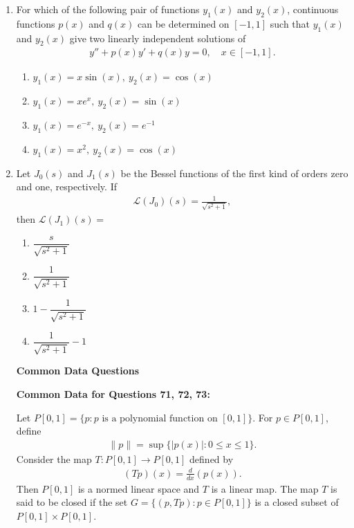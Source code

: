 \documentclass[journal]{IEEEtran}
\numberwithin{equation}{enumi}
\numberwithin{figure}{enumi}
\begin{document}
\begin{enumerate}
\item For which of the following pair of functions $y_1(x)$ and $y_2(x)$, continuous functions $p(x)$ and $q(x)$ can be determined on $[-1, 1]$ such that $y_1(x)$ and $y_2(x)$ give two linearly independent solutions of \hfill{}
\begin{align*}
y'' + p(x)y' + q(x)y = 0,\quad x \in [-1, 1].
\end{align*}
\begin{multicols}{2}
    \begin{enumerate}
        \item $y_1(x) = x \sin(x),\ y_2(x) = \cos(x)$
        \item $y_1(x) = x e^x,\ y_2(x) = \sin(x)$ 
        \item $y_1(x) = e^{-x},\ y_2(x) = e^{-1}$
        \item $y_1(x) = x^2,\ y_2(x) = \cos(x)$
    \end{enumerate}
    \end{multicols}
 



\item Let $J_0(s)$ and $J_1(s)$ be the Bessel functions of the first kind of orders zero and one, respectively. If
\begin{align*}
\mathcal{L}(J_0)(s) = \frac{1}{\sqrt{s^2 + 1}},
\end{align*}
then $\mathcal{L}(J_1)(s) =$
\hfill{}
\begin{multicols}{2}
    \begin{enumerate}
        \item $\dfrac{s}{\sqrt{s^2 + 1}}$
        \item $\dfrac{1}{\sqrt{s^2 + 1}}$
        \item $1 - \dfrac{1}{\sqrt{s^2 + 1}}$
        \item $\dfrac{1}{\sqrt{s^2 + 1}} - 1$
    \end{enumerate}
    \end{multicols}
 
\bigskip

\begin{center}
    \textbf{Common Data Questions}
\end{center}

\textbf{Common Data for Questions 71, 72, 73:}

Let $P[0,1] = \{p : p \text{ is a polynomial function on } [0,1]\}$. For $p \in P[0,1]$, define
\begin{align*}
\|p\| = \sup \{|p(x)| : 0 \leq x \leq 1\}.
\end{align*}
Consider the map $T : P[0,1] \rightarrow P[0,1]$ defined by
\begin{align*}
(Tp)(x) = \frac{d}{dx} \left(p(x)\right).
\end{align*}
Then $P[0,1]$ is a normed linear space and $T$ is a linear map. The map $T$ is said to be closed if the set $G = \{(p, Tp) : p \in P[0,1]\}$ is a closed subset of $P[0,1] \times P[0,1]$.


\end{enumerate}
\end{document}
